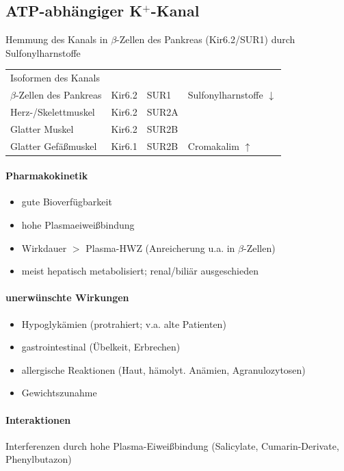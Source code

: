 \documentclass[10pt,a4paper]{report}
\begin{document}
\subsection{ATP-abhängiger K$^+$-Kanal} %
\label{ssub:atp_abh_ngiger_k_kanal}
Hemmung des Kanals in $\beta$-Zellen des Pankreas (Kir6.2/SUR1) durch Sulfonylharnstoffe \\
\begin{tabularx}{\textwidth}{XXXX}
Isoformen des Kanals&&&\\
$\beta$-Zellen des Pankreas&Kir6.2&SUR1&Sulfonylharnstoffe $\downarrow$\\
Herz-/Skelettmuskel&Kir6.2&SUR2A&\\
Glatter Muskel&Kir6.2&SUR2B\\
Glatter Gefäßmuskel&Kir6.1&SUR2B&Cromakalim $\uparrow$\\
\end{tabularx} 
\paragraph{Pharmakokinetik} %
\label{subp:pharmakokinetik}
\begin{itemize}
	\item gute Bioverfügbarkeit
	\item hohe Plasmaeiweißbindung
	\item Wirkdauer $>$ Plasma-HWZ (Anreicherung u.a. in $\beta$-Zellen)
	\item meist hepatisch metabolisiert; renal/biliär ausgeschieden
\end{itemize}
\paragraph{unerwünschte Wirkungen} %
\label{subp:unerw_nschte_wirkungen}
\begin{itemize}
	\item  Hypoglykämien (protrahiert; v.a. alte Patienten)
	\item gastrointestinal (Übelkeit, Erbrechen)
	\item allergische Reaktionen (Haut, hämolyt. Anämien, Agranulozytosen)
	\item Gewichtszunahme
\end{itemize}
\paragraph{Interaktionen} %
\label{subp:interaktionen}
Interferenzen durch hohe Plasma-Eiweißbindung (Salicylate, Cumarin-Derivate, Phenylbutazon)
\end{document}
